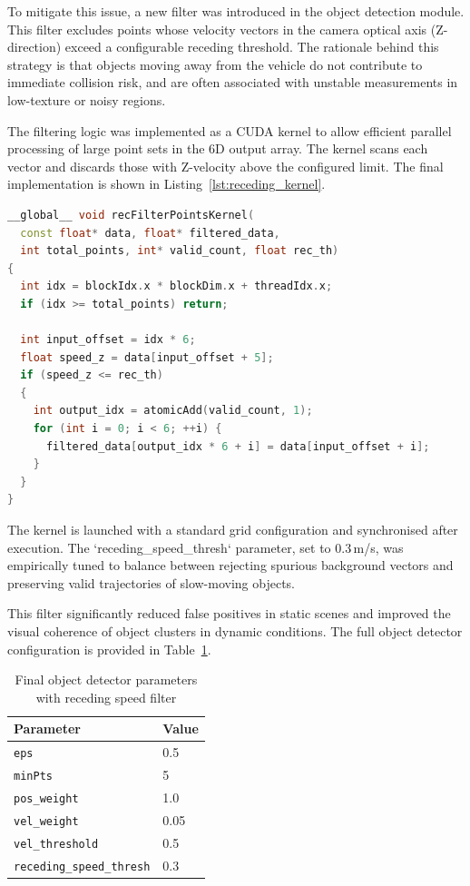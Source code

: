 To mitigate this issue, a new filter was introduced in the object detection 
module. This filter excludes points whose velocity vectors in the camera 
optical axis (Z-direction) exceed a configurable receding threshold. 
The rationale behind this strategy is that objects moving away from the 
vehicle do not contribute to immediate collision risk, and are often 
associated with unstable measurements in low-texture or noisy regions.

The filtering logic was implemented as a CUDA kernel to allow efficient 
parallel processing of large point sets in the 6D output array. The kernel 
scans each vector and discards those with Z-velocity above the configured 
limit. The final implementation is shown in 
Listing~\ref{lst:receding_kernel}.

\begin{lstlisting}[language=c++,caption={CUDA kernel to filter 
receding motion vectors.},label={lst:receding_kernel}]
__global__ void recFilterPointsKernel(
  const float* data, float* filtered_data,
  int total_points, int* valid_count, float rec_th) 
{
  int idx = blockIdx.x * blockDim.x + threadIdx.x;
  if (idx >= total_points) return;

  int input_offset = idx * 6;  
  float speed_z = data[input_offset + 5];  
  if (speed_z <= rec_th) 
  {
    int output_idx = atomicAdd(valid_count, 1);
    for (int i = 0; i < 6; ++i) {
      filtered_data[output_idx * 6 + i] = data[input_offset + i];
    }
  }
}
\end{lstlisting}

The kernel is launched with a standard grid configuration and synchronised 
after execution. The `receding\_speed\_thresh` parameter, set to 0.3\,m/s, 
was empirically tuned to balance between rejecting spurious background 
vectors and preserving valid trajectories of slow-moving objects.

This filter significantly reduced false positives in static scenes and 
improved the visual coherence of object clusters in dynamic conditions. 
The full object detector configuration is provided in 
Table~\ref{tab:carnegie_detector_params}.

\begin{table}[H]
  \centering
  \begin{tabular}{l l}
    \toprule
    \textbf{Parameter} & \textbf{Value} \\
    \midrule
    \texttt{eps}                   & 0.5 \\
    \texttt{minPts}                & 5 \\
    \texttt{pos\_weight}           & 1.0 \\
    \texttt{vel\_weight}           & 0.05 \\
    \texttt{vel\_threshold}        & 0.5 \\
    \texttt{receding\_speed\_thresh} & 0.3 \\
    \bottomrule
  \end{tabular}
  \caption{Final object detector parameters with receding speed filter}\label{tab:carnegie_detector_params}
\end{table}


